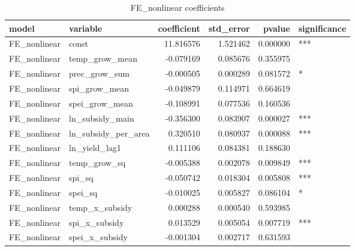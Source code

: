 \begin{table}
\caption{FE_nonlinear coefficients}
\label{tab:FE_nonlinear_coef}
\begin{tabular}{llrrrl}
\toprule
model & variable & coefficient & std_error & pvalue & significance \\
\midrule
FE_nonlinear & const & 11.816576 & 1.521462 & 0.000000 & *** \\
FE_nonlinear & temp_grow_mean & -0.079169 & 0.085676 & 0.355975 &  \\
FE_nonlinear & prec_grow_sum & -0.000505 & 0.000289 & 0.081572 & * \\
FE_nonlinear & spi_grow_mean & -0.049879 & 0.114971 & 0.664619 &  \\
FE_nonlinear & spei_grow_mean & -0.108991 & 0.077536 & 0.160536 &  \\
FE_nonlinear & ln_subsidy_main & -0.356300 & 0.083907 & 0.000027 & *** \\
FE_nonlinear & ln_subsidy_per_area & 0.320510 & 0.080937 & 0.000088 & *** \\
FE_nonlinear & ln_yield_lag1 & 0.111106 & 0.084381 & 0.188630 &  \\
FE_nonlinear & temp_grow_sq & -0.005388 & 0.002078 & 0.009849 & *** \\
FE_nonlinear & spi_sq & -0.050742 & 0.018304 & 0.005808 & *** \\
FE_nonlinear & spei_sq & -0.010025 & 0.005827 & 0.086104 & * \\
FE_nonlinear & temp_x_subsidy & 0.000288 & 0.000540 & 0.593985 &  \\
FE_nonlinear & spi_x_subsidy & 0.013529 & 0.005054 & 0.007719 & *** \\
FE_nonlinear & spei_x_subsidy & -0.001304 & 0.002717 & 0.631593 &  \\
\bottomrule
\end{tabular}
\end{table}
